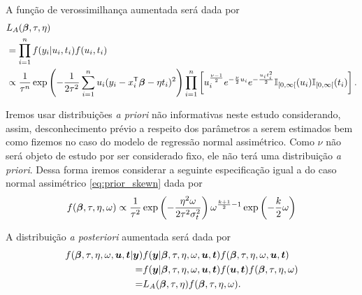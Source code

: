 A função de verossimilhança aumentada será dada por 
\begin{equation}
\begin{split}
&L_A({\boldsymbol{\beta}},\tau,\eta)  \\
& = \prod_{i=1}^nf(y_i|u_i,t_i)f(u_i,t_i) \\
& \propto \frac{1}{\tau^n}\exp\left(-\frac{1}{2\tau^2}\sum_{i=1}^nu_i(y_i-x_i^{\mathsf{T}}{\boldsymbol{\beta}}-\eta t_i)^2\right)\prod_{i=1}^n\left[u_i^{\frac{\nu-1}{2}}e^{-\frac{\nu}{2}u_i}e^{-\frac{u_it_i^2}{2}}\mathbb{I}_{[0,\infty[}(u_i)\mathbb{I}_{[0,\infty[}(t_i)\right].
\end{split}
\end{equation}

Iremos usar distribuições \textit{a priori} não informativas neste estudo considerando, assim, desconhecimento prévio a respeito dos parâmetros a serem estimados bem como fizemos no caso do modelo de regressão normal assimétrico. Como $\nu$ não será objeto de estudo por ser considerado fixo, ele não terá uma distribuição \textit{a priori}. Dessa forma iremos considerar a seguinte especificação igual a do caso normal assimétrico \eqref{eq:prior_skewn} dada por
\begin{equation}
f({\boldsymbol{\beta}},\tau,\eta,\omega) \propto \frac{1}{\tau^2}\exp\left(-\frac{\eta^2\omega}{2\tau^2\sigma_t^2}\right)\omega^{\frac{k+1}{2}-1}\exp\left(-\frac{k}{2}\omega\right)
\end{equation}

A distribuição \textit{a posteriori} aumentada será dada por
\begin{equation}\label{eq:post_aum_skewt}
\begin{split}
f({\boldsymbol{\beta}},\tau,\eta,\omega,{\boldsymbol{u}},{\boldsymbol{t}}|{\boldsymbol{y}}) & f({\boldsymbol{y}}|{\boldsymbol{\beta}},\tau,\eta,\omega,{\boldsymbol{u}},{\boldsymbol{t}})f({\boldsymbol{\beta}},\tau,\eta,\omega,{\boldsymbol{u}},{\boldsymbol{t}})\\
=&f({\boldsymbol{y}}|{\boldsymbol{\beta}},\tau,\eta,\omega,{\boldsymbol{u}},{\boldsymbol{t}})f({\boldsymbol{u}},{\boldsymbol{t}})f({\boldsymbol{\beta}},\tau,\eta,\omega)\\
=&L_A({\boldsymbol{\beta}},\tau,\eta)f({\boldsymbol{\beta}},\tau,\eta,\omega).
\end{split}
\end{equation}

